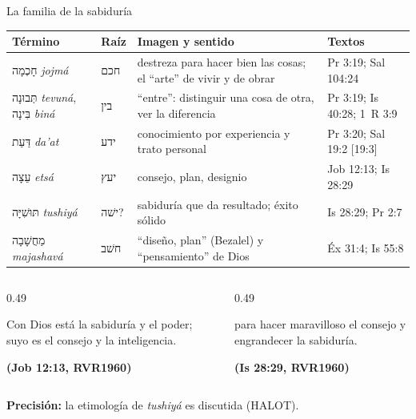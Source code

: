 \documentclass[hyperref={bookmarks=false},aspectratio=169]{beamer}
\newcommand{\heb}[1]{\mbox{\foreignlanguage{hebrew}{#1}}}
\newcommand{\fuente}[1]{\par\hfill{\upshape\bfseries\footnotesize\textcolor{azul}{#1}}}
\newcommand{\precision}[1]{{\footnotesize\color{gris}\textbf{Precisión:} #1}}
\begin{document}
\begin{frame}{La familia de la sabiduría}
\scriptsize\renewcommand{\arraystretch}{1.16}
\begin{tabular}{@{}>{\RaggedRight\arraybackslash}p{2.3cm}>{\RaggedRight\arraybackslash}p{1.0cm}>{\RaggedRight\arraybackslash}p{5.0cm}>{\RaggedRight\arraybackslash}p{3.4cm}@{}}
\toprule
\textbf{Término} & \textbf{Raíz} & \textbf{Imagen y sentido} & \textbf{Textos} \\ \midrule
\heb{חָכְמָה} \emph{jojmá} & \heb{חכם} & destreza para hacer bien las cosas; el ``arte'' de vivir y de obrar & Pr 3:19; Sal 104:24 \\
\heb{תְּבוּנָה} \emph{tevuná}, \heb{בִּינָה} \emph{biná} & \heb{בין} & ``entre'': distinguir una cosa de otra, ver la diferencia & Pr 3:19; Is 40:28; 1~R 3:9 \\
\heb{דַּעַת} \emph{da'at} & \heb{ידע} & conocimiento por experiencia y trato personal & Pr 3:20; Sal 19:2 [19:3] \\
\heb{עֵצָה} \emph{etsá} & \heb{יעץ} & consejo, plan, designio & Job 12:13; Is 28:29 \\
\heb{תּוּשִׁיָּה} \emph{tushiyá} & \heb{ישׁה}? & sabiduría que da resultado; éxito sólido & Is 28:29; Pr 2:7 \\
\heb{מַחֲשָׁבָה} \emph{majashavá} & \heb{חשׁב} & ``diseño, plan'' (Bezalel) y ``pensamiento'' de Dios & Éx 31:4; Is 55:8 \\
\bottomrule
\end{tabular}\par\medskip
\begin{columns}[t,onlytextwidth]
\begin{column}{0.49\textwidth}
\begin{cita}Con Dios está la sabiduría y el poder; suyo es el consejo y la inteligencia.\fuente{(Job 12:13, RVR1960)}\end{cita}
\end{column}
\begin{column}{0.49\textwidth}
\begin{cita}para hacer maravilloso el consejo y engrandecer la sabiduría.\fuente{(Is 28:29, RVR1960)}\end{cita}
\end{column}
\end{columns}
\precision{la etimología de \emph{tushiyá} es discutida (HALOT).}
\end{frame}
\end{document}
